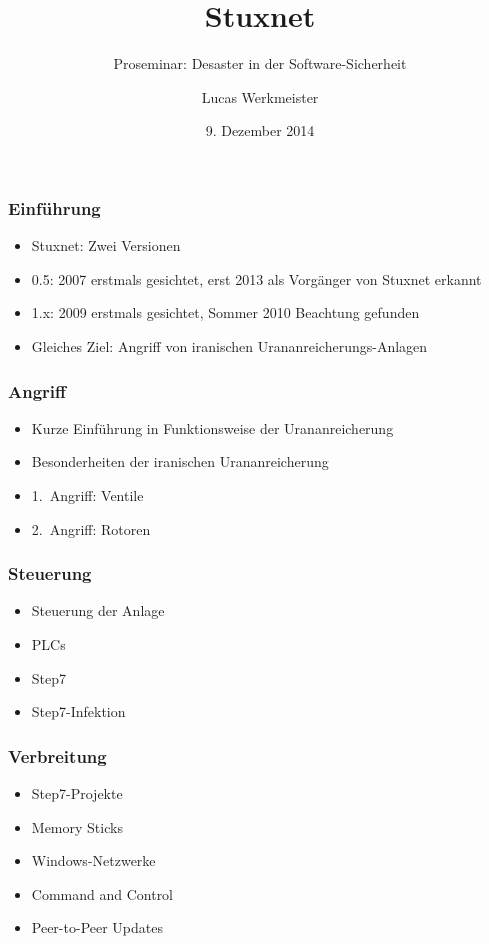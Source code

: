 \documentclass{beamer}
\title{Stuxnet}
\subtitle{Proseminar: Desaster in der Software-Sicherheit}
\author{Lucas Werkmeister}
\date{9. Dezember 2014}
\begin{document}
\begin{frame}
  \titlepage
\end{frame}

\begin{frame}
  \frametitle{Einführung}
  \begin{itemize}
    \item Stuxnet: Zwei Versionen
    \item 0.5: 2007 erstmals gesichtet, erst 2013 als Vorgänger von Stuxnet erkannt
    \item 1.x: 2009 erstmals gesichtet, Sommer 2010 Beachtung gefunden
    \item Gleiches Ziel: Angriff von iranischen Urananreicherungs-Anlagen
  \end{itemize}
\end{frame}

\begin{frame}
  \frametitle{Angriff}
  \begin{itemize}
    \item Kurze Einführung in Funktionsweise der Urananreicherung
    \item Besonderheiten der iranischen Urananreicherung
    \item 1.~Angriff: Ventile
    \item 2.~Angriff: Rotoren
  \end{itemize}
\end{frame}

\begin{frame}
  \frametitle{Steuerung}
  \begin{itemize}
    \item Steuerung der Anlage
    \item PLCs
    \item Step7
    \item Step7-Infektion
  \end{itemize}
\end{frame}

\begin{frame}
  \frametitle{Verbreitung}
  \begin{itemize}
    \item Step7-Projekte
    \item Memory Sticks
    \item Windows-Netzwerke
    \item Command and Control
    \item Peer-to-Peer Updates
  \end{itemize}
\end{frame}
\end{document}
